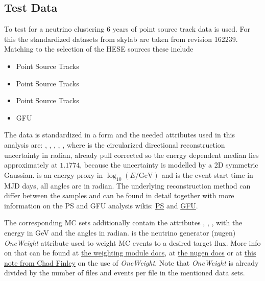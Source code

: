 \subsection{Test Data}
To test for a neutrino clustering 6 years of point source track data is used.
For this the standardized datasets from skylab are taken from revision 162239.
Matching to the selection of the HESE sources these include
\begin{itemize}
  \item Point Source Tracks 
  \item Point Source Tracks 
  \item Point Source Tracks 
  \item GFU 
\end{itemize}
The data is standardized in a  form and the needed attributes used in this analysis are: , , , , , where  is the circularized directional reconstruction uncertainty in radian, already pull corrected so the energy dependent median lies approximately at $1.1774$, because the uncertainty is modelled by a 2D symmetric Gaussian.
 is an energy proxy in $\log_{10}(E/\si{\GeV})$ and  is the event start time in MJD days, all angles are in radian.
The underlying reconstruction method can differ between the samples and can be found in detail together with more information on the PS and GFU analysis wikis: \href{https://icecube.wisc.edu/~coenders/html/build/html/ic86-bdt/muonL3.html}{PS} and \href{https://icecube.wisc.edu/~tkintscher/internal/gfu_doc/eventselection.html}{GFU}.

The corresponding MC sets additionally contain the attributes , , ,  with the energy in \si{\GeV} and the angles in radian.
 is the neutrino generator (nugen) \emph{OneWeight} attribute used to weight MC events to a desired target flux.
More info on that can be found at \href{http://software.icecube.wisc.edu/documentation/projects/weighting/tutorial.html#calculating-an-effective-area-with-neutrinogenerator}{the weighting module docs}, at \href{http://software.icecube.wisc.edu/documentation/projects/neutrino-generator/weightdict.html#oneweight}{the nugen docs} or at \href{https://docushare.icecube.wisc.edu/dsweb/Get/Document-44937/OneWeight.pdf}{this note from Chad Finley} on the use of \emph{OneWeight}.
Note that \emph{OneWeight} is already divided by the number of files and events per file in the mentioned data sets.

